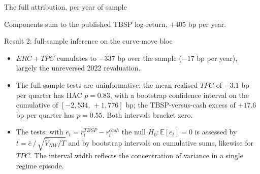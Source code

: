 \documentclass[aspectratio=169,11pt]{beamer}
\begin{document}
\begin{frame}{The full attribution, per year of sample}
  \begin{center}
  \end{center}
  \footnotesize\color{ycmuted} Components sum to the published TBSP
  log-return, $+405$ bp per year.
\end{frame}

\begin{frame}{Result 2: full-sample inference on the curve-move bloc}
  \begin{itemize}
    \item $ERC+TPC$ cumulates to $-337$ bp over the sample ($-17$ bp per
          year), largely the unreversed 2022 revaluation.
    \item The full-sample tests are uninformative: the mean realised $TPC$ of
          $-3.1$ bp per quarter has HAC $p=0.83$, with a bootstrap confidence
          interval on the cumulative of $[-2{,}534,\,+1{,}776]$ bp; the
          TBSP-versus-cash excess of $+17.6$ bp per quarter has $p=0.55$.
          Both intervals bracket zero.
    \item The tests: with $e_t = r^{TBSP}_t - r^{cash}_t$ the null
          $H_0\!: \mathbb{E}[e_t]=0$ is assessed by
          \( t = \bar e \,/\, \sqrt{\widehat{V}_{NW}/T} \) and by
          bootstrap intervals on cumulative sums, likewise for $TPC$. The
          interval width reflects the concentration of variance in a single
          regime episode.
  \end{itemize}
\end{frame}
\end{document}
